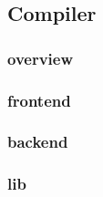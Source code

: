 \subsection{Compiler}\label{section: ola-lang-language-compiler}
\subsubsection{overview}\label{section: overview}
\subsubsection{frontend}\label{section: frontend}
\subsubsection{backend}\label{section: backend}
\subsubsection{lib}\label{section: lib}





